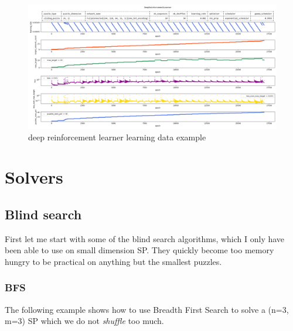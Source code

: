 \begin{landscape}
\centering\vspace*{\fill}
\begin{figure}[H]
\centering
\includegraphics[scale=0.55]{./Figures/exampledeepreinforcementlearnerlearning}
\caption[Examples]{deep reinforcement learner learning data example}
\label{fig:exampledeepreinforcementlearnerlearning}
\end{figure}
\vfill
\end{landscape}
\restoregeometry






\section{Solvers}

\subsection{Blind search}
First let me start with some of the blind search algorithms, which I only have been able to use on small dimension SP. They quickly become too memory hungry to be practical on anything but the smallest puzzles.
\subsubsection{BFS}
\label{BFSSS}
The following example shows how to use Breadth First Search to solve a (n=3, m=3) SP which we do not \textit{shuffle} too much.

